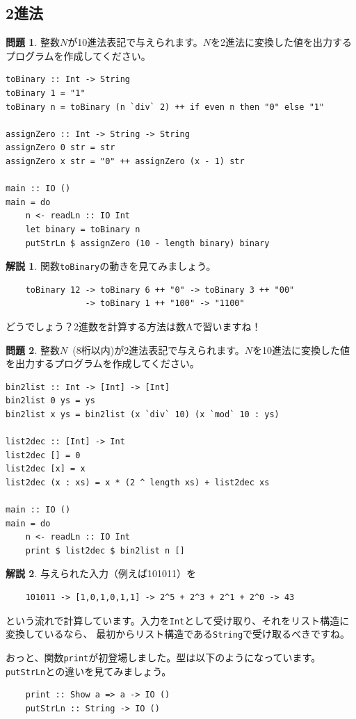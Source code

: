 \documentclass[12pt,a4paper,dvipdfmx,fleqn]{article}%
\theoremstyle{definition}
\newtheorem*{toi*}{問題}
\theoremstyle{definition}
\newtheorem*{ans*}{解説}
\theoremstyle{definition}
\begin{document}
\subsection{2進法}\label{2進法}
\begin{toi*}
    整数$N$が10進法表記で与えられます。$N$を2進法に変換した値を出力するプログラムを作成してください。
\end{toi*}
\begin{lstlisting}[caption=A04.hs,label=A04]
toBinary :: Int -> String
toBinary 1 = "1"
toBinary n = toBinary (n `div` 2) ++ if even n then "0" else "1"

assignZero :: Int -> String -> String
assignZero 0 str = str
assignZero x str = "0" ++ assignZero (x - 1) str

main :: IO ()
main = do
    n <- readLn :: IO Int
    let binary = toBinary n
    putStrLn $ assignZero (10 - length binary) binary
\end{lstlisting}
\begin{ans*}
    関数\texttt{toBinary}の動きを見てみましょう。
    \begin{verbatim}
    toBinary 12 -> toBinary 6 ++ "0" -> toBinary 3 ++ "00"
                -> toBinary 1 ++ "100" -> "1100"
    \end{verbatim}
    \vspace*{-4mm}
    どうでしょう？2進数を計算する方法は数Aで習いますね！
\end{ans*}
\begin{toi*}
    整数$N$~(8桁以内)が2進法表記で与えられます。$N$を10進法に変換した値を出力するプログラムを作成してください。
\end{toi*}
\begin{lstlisting}[caption=B04.hs,label=B04]
bin2list :: Int -> [Int] -> [Int]
bin2list 0 ys = ys
bin2list x ys = bin2list (x `div` 10) (x `mod` 10 : ys)

list2dec :: [Int] -> Int
list2dec [] = 0
list2dec [x] = x
list2dec (x : xs) = x * (2 ^ length xs) + list2dec xs

main :: IO ()
main = do
    n <- readLn :: IO Int
    print $ list2dec $ bin2list n []
\end{lstlisting}
\begin{ans*}
    与えられた入力（例えば101011）を
    \begin{verbatim}
    101011 -> [1,0,1,0,1,1] -> 2^5 + 2^3 + 2^1 + 2^0 -> 43
    \end{verbatim}
    \vspace*{-4mm}
    という流れで計算しています。入力を\texttt{Int}として受け取り、それをリスト構造に変換しているなら、
    最初からリスト構造である\texttt{String}で受け取るべきですね。\par
    おっと、関数\texttt{print}が初登場しました。型は以下のようになっています。
    \texttt{putStrLn}との違いを見てみましょう。
    \begin{verbatim}
    print :: Show a => a -> IO ()
    putStrLn :: String -> IO ()
    \end{verbatim}
    \vspace*{-4mm}
\end{ans*}
\end{document}
